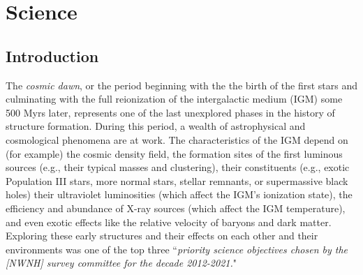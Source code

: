 \documentclass[preprint]{aastex}
\begin{document}
\section{Science} %

\subsection{Introduction}    %


The {\it cosmic dawn}, or the period beginning with the the birth of the first stars and culminating with the full
reionization of the intergalactic medium (IGM) some 500 Myrs later, represents one of the last unexplored phases in 
the history of structure formation. During this period, a wealth of astrophysical and cosmological phenomena are at 
work. The characteristics of the IGM depend on (for example) the cosmic density field, the formation sites of the 
first luminous sources (e.g., their typical masses and clustering), their constituents (e.g., exotic Population III 
stars, more normal stars, stellar remnants, or supermassive black holes) their ultraviolet luminosities (which affect 
the IGM's ionization state), the efficiency and abundance of X-ray sources (which affect the IGM temperature), and 
even exotic effects like the relative velocity of baryons and dark matter.  Exploring these early structures and their 
effects on each other and their environments was one of the top three ``{\it priority science objectives chosen by 
the [NWNH] survey committee for the decade 2012-2021.}"
\end{document}

